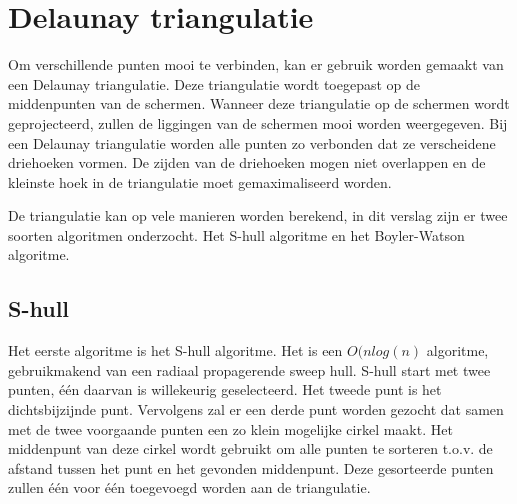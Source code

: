 \section{Delaunay triangulatie}
Om verschillende punten mooi te verbinden, kan er gebruik worden gemaakt van een Delaunay triangulatie. Deze triangulatie wordt toegepast op de middenpunten van de schermen. Wanneer deze triangulatie op de schermen wordt geprojecteerd, zullen de liggingen van de schermen mooi worden weergegeven. Bij een Delaunay triangulatie worden alle punten zo verbonden dat ze verscheidene driehoeken vormen. De zijden van de driehoeken mogen niet overlappen en de kleinste hoek in de triangulatie moet gemaximaliseerd worden. \cite{delaunaywiki}

De triangulatie kan op vele manieren worden berekend, in dit verslag zijn er twee soorten algoritmen onderzocht. Het S-hull algoritme en het Boyler-Watson algoritme.

\subsection{S-hull}
Het eerste algoritme is het S-hull algoritme. Het is een $O(nlog(n)$ algoritme, gebruikmakend van een radiaal propagerende sweep hull. S-hull start met twee punten, één daarvan is willekeurig geselecteerd. Het tweede punt is het dichtsbijzijnde punt. Vervolgens zal er een derde punt worden gezocht dat samen met de twee voorgaande punten een zo klein mogelijke cirkel maakt. Het middenpunt van deze cirkel wordt gebruikt om alle punten te sorteren t.o.v. de afstand tussen het punt en het gevonden middenpunt. Deze gesorteerde punten zullen één voor één toegevoegd worden aan de triangulatie.

